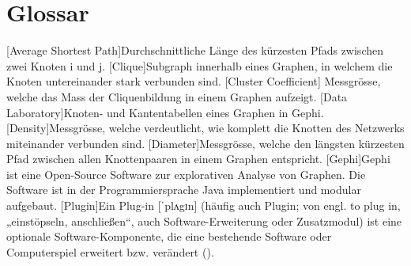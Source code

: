 \chapter*{Glossar}

\begin{acronym}
    [Average Shortest Path]{Durchschnittliche Länge des kürzesten Pfads zwischen zwei Knoten i und j.}
    [Clique]{Subgraph innerhalb eines Graphen, in welchem die Knoten untereinander stark verbunden sind.}
    [Cluster Coefficient] Messgrösse, welche das Mass der Cliquenbildung in einem Graphen aufzeigt.
    [Data Laboratory]{Knoten- und Kantentabellen eines Graphen in Gephi.}
    [Density]{Messgrösse, welche verdeutlicht, wie komplett die Knotten des Netzwerks miteinander verbunden sind.}
    [Diameter]{Messgrösse, welche den längsten kürzesten Pfad zwischen allen Knottenpaaren in einem Graphen entspricht.}
    [Gephi]{Gephi ist eine Open-Source Software zur explorativen
    Analyse von Graphen. Die Software ist in der Programmiersprache Java implementiert
    und modular aufgebaut.}
    [Plugin]{Ein Plug-in [ˈplʌgɪn] (häufig auch Plugin; von engl. to plug in, „einstöpseln, anschließen“, auch Software-Erweiterung oder Zusatzmodul) ist eine optionale Software-Komponente, die eine bestehende Software oder Computerspiel erweitert bzw. verändert (\cite{noauthor_plug-_2019}).}
\end{acronym}
